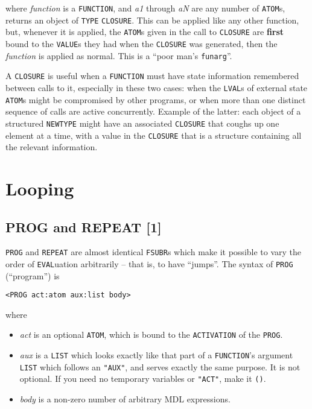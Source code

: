 \documentclass[a4paper]{scrbook}
\providecommand{\tightlist}{%
  \setlength{\itemsep}{0pt}\setlength{\parskip}{0pt}}
\begin{document}
 where \emph{function} is a \texttt{FUNCTION}, and \emph{a1} through \emph{aN} are any
number of \texttt{ATOM}s, returns an object of \texttt{TYPE} \texttt{CLOSURE}. This can be applied like any other function,
but, whenever it is applied, the \texttt{ATOM}s given in the call to \texttt{CLOSURE} are \textbf{first} bound to the
\texttt{VALUE}s they had when the \texttt{CLOSURE} was generated, then the \emph{function} is applied as normal. This is a
``poor man's \texttt{funarg}''.

A \texttt{CLOSURE} is useful when a \texttt{FUNCTION} must have state information remembered between calls to it,
especially in these two cases: when the \texttt{LVAL}s of external state \texttt{ATOM}s might be compromised by other
programs, or when more than one distinct sequence of calls are active concurrently. Example of the latter: each object of a
structured \texttt{NEWTYPE} might have an associated \texttt{CLOSURE} that coughs up one element at a time, with a value in
the \texttt{CLOSURE} that is a structure containing all the relevant information.

\chapter{Looping}\label{chapter-10.-looping}

\section{PROG and REPEAT {[}1{]}}\label{prog-and-repeat-1}

\texttt{PROG}  and \texttt{REPEAT}  are almost identical
\texttt{FSUBR}s  which make it possible to vary the order of \texttt{EVAL}uation arbitrarily -- that
is, to have ``jumps''. The syntax of \texttt{PROG} (``program'') is

\begin{verbatim}
<PROG act:atom aux:list body>
\end{verbatim}

where

\begin{itemize}
\tightlist
\item
  \emph{act} is an optional \texttt{ATOM}, which is bound to the \texttt{ACTIVATION} of the \texttt{PROG}.
\item
  \emph{aux} is a \texttt{LIST} which looks exactly like that part of a \texttt{FUNCTION}'s argument \texttt{LIST} which
  follows an \texttt{"AUX"}, and serves exactly the same purpose. It is not optional. If you need no temporary variables or
  \texttt{"ACT"}, make it \texttt{()}.
\item
  \emph{body} is a non-zero number of arbitrary MDL expressions.
\end{itemize}
\end{document}
